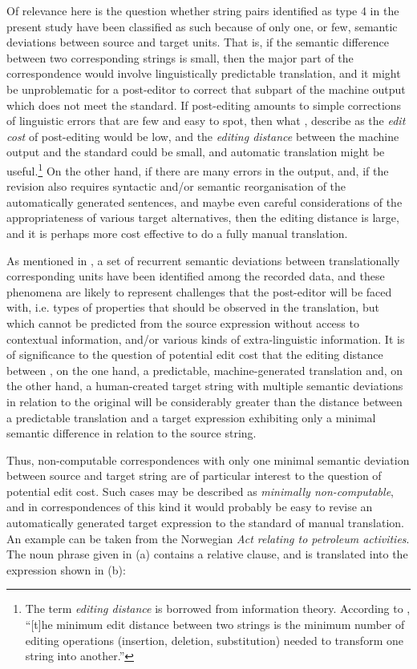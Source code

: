 \documentclass[output=paper]{LSP/langsci}
\begin{document}
Of relevance here is the question whether string pairs identified as type 4 in the present study have been classified as such because of only one, or few, semantic deviations between source and target units. That is, if the semantic difference between two corresponding strings is small, then the major part of the correspondence would involve linguistically predictable translation, and it might be unproblematic for a post-editor to correct that subpart of the machine output which does not meet the standard. If post-editing amounts to simple corrections of linguistic errors that are few and easy to spot, then what \citet[931]{Jurafsky2009}, describe as the \textit{edit cost} of post-editing would be low, and the \textit{editing distance }between the machine output and the standard could be small, and automatic translation might be useful.\footnote{The term \textit{editing distance} is borrowed from information theory. According to \citet[108]{Jurafsky2009}, ``[t]he minimum edit distance between two strings is the minimum number of editing operations (insertion, deletion, substitution) needed to transform one string into another.''} On the other hand, if there are many errors in the output, and, if the revision also requires syntactic and/or semantic reorganisation of the automatically generated sentences, and maybe even careful considerations of the appropriateness of various target alternatives, then the editing distance is large, and it is perhaps more cost effective to do a fully manual translation.

As mentioned in , a set of recurrent semantic deviations between translationally corresponding units have been identified among the recorded data, and these phenomena are likely to represent challenges that the post-editor will be faced with, i.e. types of properties that should be observed in the translation, but which cannot be predicted from the source expression without access to contextual information, and/or various kinds of extra-linguistic information. It is of significance to the question of potential edit cost that the editing distance between , on the one hand, a predictable, machine-generated translation and, on the other hand, a human-created target string with multiple semantic deviations in relation to the original will be considerably greater than the distance between a predictable translation and a target expression exhibiting only a minimal semantic difference in relation to the source string.

Thus, non-computable correspondences with only one minimal semantic deviation between source and target string are of particular interest to the question of potential edit cost. Such cases may be described as \textit{minimally non-computable}, and in correspondences of this kind it would probably be easy to revise an automatically generated target expression to the standard of manual translation. An example can be taken from the Norwegian \textit{Act relating to petroleum activities}. The noun phrase given in (a) contains a relative clause, and is translated into the expression shown in (b):
\end{document}
